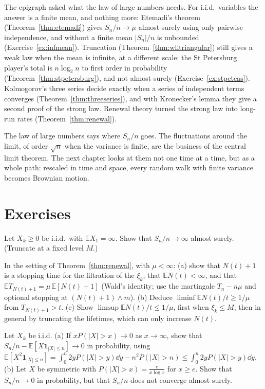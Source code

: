 The epigraph asked what the law of large numbers needs. For i.i.d.\ variables the answer is a finite mean, and nothing more: Etemadi's
theorem (Theorem~\ref{thm:etemadi}) gives $S_n/n\to\mu$ almost surely using only pairwise independence, and without a finite mean
$|S_n|/n$ is unbounded (Exercise~\ref{ex:infmean}). Truncation (Theorem~\ref{thm:wlltriangular}) still gives a weak law when the
mean is infinite, at a different scale: the St Petersburg player's total is $n\log_2n$ to first order in probability
(Theorem~\ref{thm:stpetersburg}), and not almost surely (Exercise~\ref{ex:stpeteas}). Kolmogorov's three series decide exactly when a
series of independent terms converges (Theorem~\ref{thm:threeseries}), and with Kronecker's lemma they give a second proof of the strong
law. Renewal theory turned the strong law into long-run rates (Theorem~\ref{thm:renewal}).

The law of large numbers says where $S_n/n$ goes. The fluctuations around the limit, of order $\sqrt n$ when the variance is finite, are
the business of the central limit theorem. The next chapter looks at them not one time at a time, but as a whole path: rescaled in time and
space, every random walk with finite variance becomes Brownian motion.

\section{Exercises}

\begin{exercise}[$\star$]\label{ex:infmeanpos}
Let $X_k\ge0$ be i.i.d.\ with $\mathbb E X_1=\infty$. Show that $S_n/n\to\infty$ almost surely. (Truncate at a fixed level $M$.)
\end{exercise}

\begin{exercise}[$\star$]\label{ex:wald}
In the setting of Theorem~\ref{thm:renewal}, with $\mu<\infty$: (a) show that $N(t)+1$ is a stopping time for the filtration of the $\xi_k$, that
$\mathbb E N(t)<\infty$, and that $\mathbb E T_{N(t)+1}=\mu\,\mathbb E[N(t)+1]$ (Wald's identity; use the martingale $T_n-n\mu$ and optional stopping at
$(N(t)+1)\wedge m$). (b) Deduce $\liminf\mathbb E N(t)/t\ge1/\mu$ from $T_{N(t)+1}>t$. (c) Show $\limsup\mathbb E N(t)/t\le1/\mu$, first when $\xi_k\le M$,
then in general by truncating the lifetimes, which can only increase $N(t)$.
\end{exercise}

\begin{exercise}[$\star\star$]\label{ex:feller}
Let $X_k$ be i.i.d. (a) If $xP(|X|>x)\to0$ as $x\to\infty$, show that $S_n/n-\mathbb E[X\mathbf 1_{|X|\le n}]\to0$ in probability, using
$\mathbb E[X^2\mathbf 1_{|X|\le n}]=\int_0^n2yP(|X|>y)\dd y-n^2P(|X|>n)\le\int_0^n2yP(|X|>y)\dd y$. (b) Let $X$ be symmetric with $P(|X|>x)=\frac e{x\log x}$ for
$x\ge e$. Show that $S_n/n\to0$ in probability, but that $S_n/n$ does not converge almost surely.
\end{exercise}

